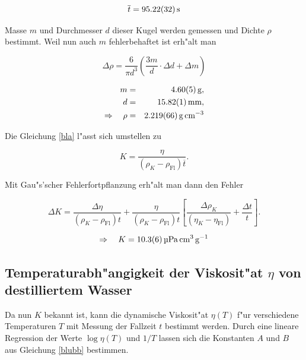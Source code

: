 		\begin{equation*}
			\overline{t} = \SI{95.22 (32)}{\second}
		\end{equation*}

		Masse $m$ und Durchmesser $d$ dieser Kugel werden gemessen und Dichte $\rho$ bestimmt.
		Weil nun auch $m$ fehlerbehaftet ist erh"alt man

		\begin{equation*}
			\Delta \rho = \frac{6}{\pi d^3} \left( \frac{3 m}{d} \cdot \Delta d + \Delta m \right)
		\end{equation*}

		\begin{eqnarray*}
				m & = & \SI{4.60 (5)}{\gram} , \\
				d & = & \SI{15.82 (1)}{\milli \meter} , \\
				\Rightarrow \quad \rho & = & \SI{2.219 (66)}{\gram \per \centi \meter \cubed}
		\end{eqnarray*}

		Die Gleichung \eqref{bla} l"asst sich umstellen zu

		\begin{equation}
			K = \frac{\eta}{\left(\rho_K - \rho_\mathrm{Fl}\right) \overline{t}} .
		\end{equation}

		Mit Gau"s'scher Fehlerfortpflanzung erh"alt man dann den Fehler

		\begin{equation*}
			\Delta K = \frac{\Delta \eta}{\left(\rho_K - \rho_\mathrm{Fl}\right) t} + \frac{\eta}{\left(\rho_K - \rho_\mathrm{Fl}\right) t} \left[ \frac{\Delta \rho_K}{\left( \eta_K - \eta_\mathrm{Fl} \right)} + \frac{\Delta t}{t} \right] .
		\end{equation*}

		\begin{equation*}
			\Rightarrow \quad K = \SI{10.3 (6)}{\micro \pascal \centi \meter \cubed \per \gram}
		\end{equation*}

	\subsection{Temperaturabh"angigkeit der Viskosit"at $\eta$ von destilliertem Wasser}
		\label{sub:temperaturabhaengigkeit}

		Da nun $K$ bekannt ist, kann die dynamische Viskosit"at $\eta (T)$ f"ur verschiedene Tem\-pe\-ra\-tu\-ren $T$ mit Messung der Fallzeit $t$ bestimmt werden.
		Durch eine lineare Regression der Werte $\log{\eta (T)}$ und $1 / T$ lassen sich die Konstanten $A$ und $B$ aus Gleichung \eqref{blubb} bestimmen.

